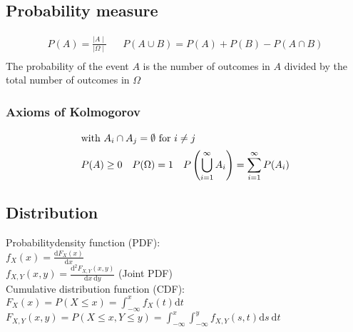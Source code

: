 \begin{mdframed}[style=eqbox]
  \subsection{Probability measure}
  \begin{align*}
    P(A) = \frac{\mid A \mid}{\mid \Omega \mid} && P(A \cup B) = P(A) + P(B) - P(A \cap B)\\
  \end{align*}
  The probability of the event $A$ is the number of outcomes in $A$ divided by the total number of outcomes in $\Omega$
  \subsubsection{Axioms of Kolmogorov}
  \begin{align*}
    \shortintertext{with $A_i \cap A_j = \emptyset$ for $i \neq j$}
    P(A) \geq 0 && P(\Omega) = 1 && P\left(\bigcup_{i=1}^{\infty} A_i\right) = \sum_{i=1}^{\infty} P(A_i)\\
  \end{align*}
\end{mdframed}

\begin{mdframed}[style=eqbox]
  \subsection{Distribution}
  Probabilitydensity function (PDF): \\
  $f_X(x) = \frac{\text{d} F_X(x)}{\text{d} x}$\\
  $f_{X,Y}(x,y) = \frac{\text{d}^2 F_{X,Y}(x,y)}{\text{d}x~\text{d}y}$ (Joint PDF)\\[0.5em]
  Cumulative distribution function (CDF): \\
  $F_X(x) = P({X \leq x}) = \int_{-\infty}^{x} f_X(t) \text{d} t$\\
  $F_{X,Y}(x,y) = P({X \leq x, Y \leq y}) = \int_{-\infty}^{x} \int_{-\infty}^{y} f_{X,Y}(s,t) \text{d}s~\text{d}t$
\end{mdframed}

